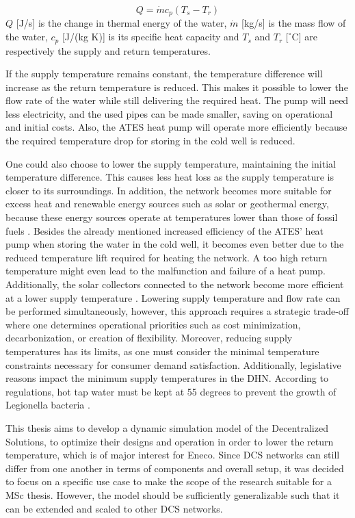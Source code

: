 \begin{equation}\label{eq::overallheat}
    Q = \dot{m} c_p (T_s - T_r)
\end{equation}
$Q$ [J/s] is the change in thermal energy of the water, $\dot{m}$ [kg/s] is the mass flow of the water, $c_p$ [J/(kg K)] is its specific heat capacity and $T_s$ and $T_r$ $[^{\circ}\text{C}$] are respectively the supply and return temperatures. 

If the supply temperature remains constant, the temperature difference will increase as the return temperature is reduced. This makes it possible to lower the flow rate of the water while still delivering the required heat. The pump will need less electricity, and the used pipes can be made smaller, saving on operational and initial costs. Also, the ATES heat pump will operate more efficiently because the required temperature drop for storing in the cold well is reduced.

One could also choose to lower the supply temperature, maintaining the initial temperature difference. This causes less heat loss as the supply temperature is closer to its surroundings. In addition, the network becomes more suitable for excess heat and renewable energy sources such as solar or geothermal energy, because these energy sources operate at temperatures lower than those of fossil fuels \cite{sustainableResources}. Besides the already mentioned increased efficiency of the ATES' heat pump when storing the water in the cold well, it becomes even better due to the reduced temperature lift required for heating the network. A too high return temperature might even lead to the malfunction and failure of a heat pump. Additionally, the solar collectors connected to the network become more efficient at a lower supply temperature \cite{booklowT}. Lowering supply temperature and flow rate can be performed simultaneously, however, this approach requires a strategic trade-off where one determines operational priorities such as cost minimization, decarbonization, or creation of flexibility. Moreover, reducing supply temperatures has its limits, as one must consider the minimal temperature constraints necessary for consumer demand satisfaction. Additionally, legislative reasons impact the minimum supply temperatures in the DHN. According to regulations, hot tap water must be kept at 55 degrees to prevent the growth of Legionella bacteria \cite{tapwaterWet}. 

This thesis aims to develop a dynamic simulation model of the Decentralized Solutions, to optimize their designs and operation in order to lower the return temperature, which is of major interest for Eneco. Since DCS networks can still differ from one another in terms of components and overall setup, it was decided to focus on a specific use case to make the scope of the research suitable for a MSc thesis. However, the model should be sufficiently generalizable such that it can be extended and scaled to other DCS networks.

